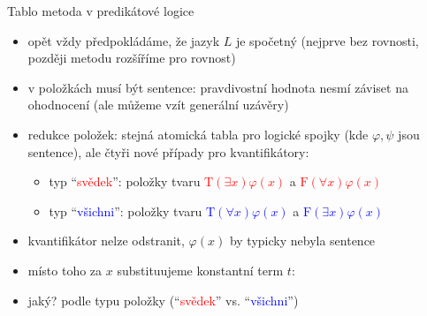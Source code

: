 \documentclass{beamer}
\begin{document}
\begin{frame}{Tablo metoda v predikátové logice}

    \pause
    \begin{itemize}
        \item opět vždy předpokládáme, že jazyk $L$ je spočetný
        (nejprve bez rovnosti, později metodu rozšíříme pro rovnost)\pause
        \item v položkách musí být \alert{sentence}: pravdivostní hodnota nesmí záviset na ohodnocení (ale můžeme vzít \alert{generální uzávěry})\pause
        \item \alert{redukce položek}: stejná atomická tabla pro logické spojky (kde $\varphi,\psi$ jsou sentence), ale čtyři nové případy \alert{pro kvantifikátory}:\pause
        \begin{itemize}
            \item typ ``\textcolor{red}{svědek}'': položky tvaru \textcolor{red}{$\mathrm{T}(\exists x)\varphi(x)$} a \textcolor{red}{$\mathrm{F}(\forall x)\varphi(x)$}\pause
            \item typ ``\textcolor{blue}{všichni}'': položky tvaru \textcolor{blue}{$\mathrm{T}(\forall x)\varphi(x)$} a \textcolor{blue}{$\mathrm{F}(\exists x)\varphi(x)$}\pause
        \end{itemize}
        \item kvantifikátor nelze odstranit, $\varphi(x)$ by typicky nebyla sentence\pause
        \item místo toho za $x$ \alert{substituujeme} \alert{konstantní term} $t$: \pause
        \item jaký? podle typu položky (``\textcolor{red}{svědek}'' vs. ``\textcolor{blue}{všichni}'')
       
    \end{itemize}        

\end{frame}
\end{document}
